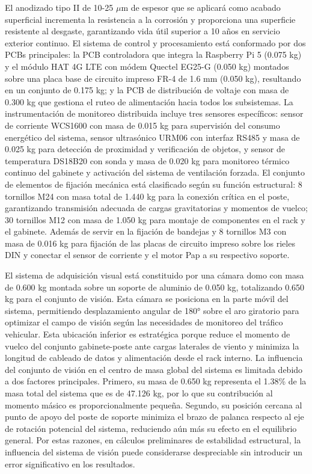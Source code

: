 \documentclass[12pt,a4paper,oneside]{report}
\begin{document}
El anodizado tipo II de 10-25 \ensuremath{\mu}m de espesor que se aplicará como acabado superficial incrementa la resistencia a la corrosión y proporciona una superficie resistente al desgaste, garantizando vida útil superior a 10 años en servicio exterior continuo. El sistema de control y procesamiento está conformado por dos PCBs principales: la PCB controladora que integra la Raspberry Pi 5 (0.075 kg) y el módulo HAT 4G LTE con módem Quectel EG25-G (0.050 kg) montados sobre una placa base de circuito impreso FR-4 de 1.6 mm (0.050 kg), resultando en un conjunto de 0.175 kg; y la PCB de distribución de voltaje con masa de 0.300 kg que gestiona el ruteo de alimentación hacia todos los subsistemas. La instrumentación de monitoreo distribuida incluye tres sensores específicos: sensor de corriente WCS1600 con masa de 0.015 kg para supervisión del consumo energético del sistema, sensor ultrasónico URM06 con interfaz RS485 y masa de 0.025 kg para detección de proximidad y verificación de objetos, y sensor de temperatura DS18B20 con sonda y masa de 0.020 kg para monitoreo térmico continuo del gabinete y activación del sistema de ventilación forzada. El conjunto de elementos de fijación mecánica está clasificado según su función estructural: 8 tornillos M24 con masa total de 1.440 kg para la conexión crítica en el poste, garantizando transmisión adecuada de cargas gravitatorias y momentos de vuelco; 30 tornillos M12 con masa de 1.050 kg para montaje de componentes en el rack y el gabinete. Además de servir en la fijación de bandejas y 8 tornillos M3 con masa de 0.016 kg para fijación de las placas de circuito impreso sobre los rieles DIN y conectar el sensor de corriente y el motor Pap a su respectivo soporte.

El sistema de adquisición visual está constituido por una cámara domo con masa de 0.600 kg montada sobre un soporte de aluminio de 0.050 kg, totalizando 0.650 kg para el conjunto de visión. Esta cámara se posiciona en la parte móvil del sistema, permitiendo desplazamiento angular de 180° sobre el aro giratorio para optimizar el campo de visión según las necesidades de monitoreo del tráfico vehicular. Esta ubicación inferior es estratégica porque reduce el momento de vuelco del conjunto gabinete-poste ante cargas laterales de viento y minimiza la longitud de cableado de datos y alimentación desde el rack interno. La influencia del conjunto de visión en el centro de masa global del sistema es limitada debido a dos factores principales. Primero, su masa de 0.650 kg representa el 1.38\% de la masa total del sistema que es de 47.126 kg, por lo que su contribución al momento másico es proporcionalmente pequeña. Segundo, su posición cercana al punto de apoyo del poste de soporte minimiza el brazo de palanca respecto al eje de rotación potencial del sistema, reduciendo aún más su efecto en el equilibrio general. Por estas razones, en cálculos preliminares de estabilidad estructural, la influencia del sistema de visión puede considerarse despreciable sin introducir un error significativo en los resultados.
\end{document}
